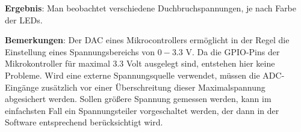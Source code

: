 \documentclass[../main.tex]{subfiles}
\begin{document}
\begin{tcolorbox}
    \vspace{0.5cm}
\textbf{Ergebnis}: Man beobachtet verschiedene Duchbruchspannungen, je nach Farbe der LEDs. 

\vspace{0.5cm}
\textbf{Bemerkungen}: Der DAC eines Mikrocontrollers ermöglicht in der Regel die Einstellung eines Spannungsbereichs von $0-3.3$ V. Da die GPIO-Pins der Mikrokontroller für maximal $3.3$ Volt ausgelegt sind, entstehen hier keine Probleme. Wird eine externe Spannungsquelle verwendet, müssen die ADC-Eingänge zusätzlich vor einer Überschreitung dieser Maximalspannung abgesichert werden. Sollen größere Spannung gemessen werden, kann im einfachsten Fall ein Spannungsteiler vorgeschaltet werden, der dann in der Software entsprechend berücksichtigt wird.

\end{tcolorbox}
\end{document}
